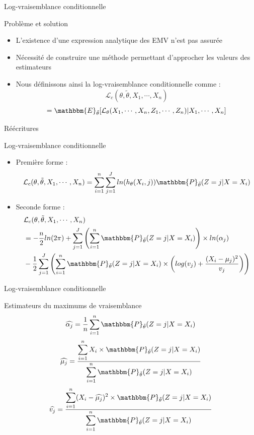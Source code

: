 \documentclass[11pt]{beamer}
\begin{document}
	\begin{frame}{Log-vraisemblance conditionnelle}
		\begin{block}{Problème et solution}
			\begin{itemize}
				\item L'existence d'une expression analytique des EMV n'est pas assurée
				\item Nécessité de construire une méthode permettant d'approcher les valeurs des estimateurs

				\item Nous définissons ainsi la log-vraisemblance conditionnelle comme :
					\[
					\mathcal{L}_{c}(\theta, \tilde{\theta}, X_1, \cdots, X_n)
					\]
					\[ = \mathbbm{E}_{\tilde{\theta}}[\mathcal{L}_\theta(X_1, \cdots, X_n, Z_1, \cdots, Z_n) | X_1, \cdots, X_n]
					\]

			\end{itemize}
		\end{block}
	\end{frame}


	\begin{frame}{Réécritures}
		\begin{block}{Log-vraisemblance conditionnelle}
			\scriptsize
			\begin{itemize}
				\item Première forme :
				\[
				\mathcal{L}_{c}(\theta, \tilde{\theta}, X_1, \cdots, X_n) = \displaystyle\sum_{i=1}^n\sum_{j=1}^J ln(h_\theta(X_i ,j))  \mathbbm{P}_{\tilde{\theta}}(Z = j|X = X_i)
				\]
				\item Seconde forme :
				\begin{align*}
				 & \mathcal{L}_{c}(\theta, \tilde{\theta}, X_1, \cdots, X_n) \\
				 &= -\frac{n}{2}ln(2\pi)+\sum_{j=1}^J \left(\sum_{i = 1}^n \mathbbm{P}_{\tilde{\theta}}(Z= j|X=X_i)\right) \times ln(\alpha_j) \\				
				&-\frac{1}{2}\sum_{j=1}^J\left(\sum_{i=1}^n  \mathbbm{P}_{\tilde{\theta}}(Z=j|X=X_i)\times\left(log(v_j)+\frac{(X_i-\mu_j)^2}{v_j}\right)\right)
				\end{align*}

			\end{itemize}
		\end{block}
	\end{frame}

	\begin{frame}{Log-vraisemblance conditionnelle}
		\begin{block}{Estimateurs du maximums de vraisemblance}
			\[
			\widehat{\alpha_j} = \displaystyle\frac{1}{n}\sum_{i=1}^n \mathbbm{P}_{\tilde{\theta}}(Z=j|X=X_i)
			\]
			\[
			\widehat{\mu_j}= \displaystyle\frac{\displaystyle\sum_{i=1}^n X_i\times\mathbbm{P}_{\tilde{\theta}}(Z=j|X=X_i)}{\displaystyle\sum_{i=1}^n \mathbbm{P}_{\tilde{\theta}}(Z=j|X=X_i)}
			\]
			\[
			\widehat{v_j} = \displaystyle\frac{\displaystyle\sum_{i=1}^n (X_i -\widehat{\mu_j})^2 \times\mathbbm{P}_{\tilde{\theta}}(Z=j|X=X_i)}{\displaystyle\sum_{i=1}^n\mathbbm{P}_{\tilde{\theta}}(Z=j|X=X_i)}
			\]			
		\end{block}
	\end{frame}
	
\end{document}
